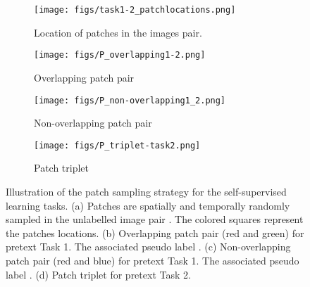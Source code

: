 \documentclass[runningheads]{llncs}
\begin{document}
\begin{figure}[!t]
\centering
\begin{subfigure}{0.9\textwidth}
\texttt{[image: figs/task1-2\_patchlocations.png]}
\caption{Location of patches in the images pair.}
\label{subfig:pretext_tasks_a}
\end{subfigure} 
\hfill

\begin{subfigure}{0.45\textwidth}
\texttt{[image: figs/P\_overlapping1-2.png]} 
\caption{Overlapping patch pair}
\label{subfig:pretext_tasks_b}
\end{subfigure}
\begin{subfigure}{0.45\textwidth}
\texttt{[image: figs/P\_non-overlapping1\_2.png]}
\caption{Non-overlapping patch pair}
\label{subfig:pretext_tasks_c}
\end{subfigure}

\begin{subfigure}{0.67\textwidth}
\texttt{[image: figs/P\_triplet-task2.png]}
\caption{Patch triplet}
\label{subfig:pretext_tasks_d}
\end{subfigure} 

\caption[Illustration of patch sampling strategy.]{Illustration of the patch sampling strategy for the self-supervised learning tasks. (a) Patches are spatially and temporally randomly sampled in the unlabelled image pair . The colored squares represent the  patches locations. (b) Overlapping patch pair (red and green) for pretext Task 1. The associated pseudo label . (c) Non-overlapping patch pair (red and blue) for pretext Task 1. The associated pseudo label . (d) Patch triplet for pretext Task 2. 
} 
\label{fig:pretext_tasks}
\end{figure}
\end{document}
